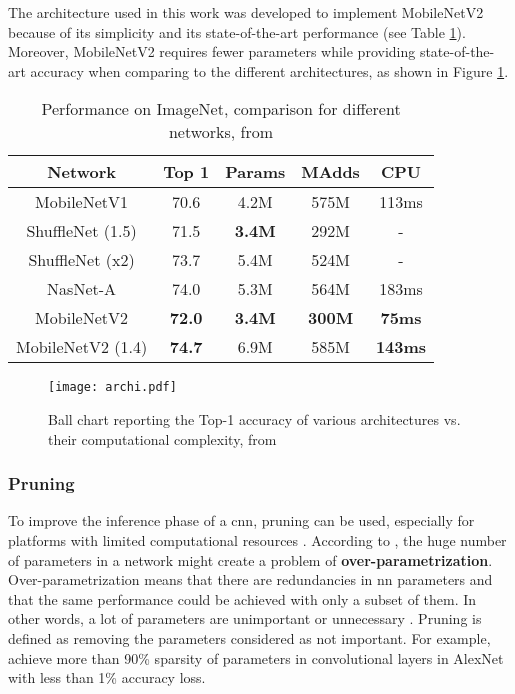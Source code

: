 The architecture used in this work was developed to implement MobileNetV2 because of its simplicity and its state-of-the-art performance (see Table \ref{tab:mbv2}). Moreover, MobileNetV2 requires fewer parameters while providing state-of-the-art accuracy when comparing to the different architectures, as shown in Figure \ref{fig:archi}.
%
\begin{table}[H]
    \center
    \begin{tabular}{ | c | c | c c | c| }
        \hline \hline
        Network & Top 1 & Params & MAdds & CPU \\
        \hline \hline
        MobileNetV1 & 70.6 & 4.2M & 575M & 113ms \\
        ShuffleNet (1.5) & 71.5 & \textbf{3.4M} & 292M & - \\
        ShuffleNet (x2)  & 73.7 & 5.4M & 524M & - \\
        NasNet-A & 74.0 & 5.3M & 564M & 183ms \\
        \hline
        MobileNetV2 & \textbf{72.0} & \textbf{3.4M} & \textbf{300M} & \textbf{75ms} \\
        MobileNetV2 (1.4) & \textbf{74.7} & 6.9M & 585M & \textbf{143ms} \\
        \hline \hline
    \end{tabular}
    \caption{Performance on ImageNet, comparison for different networks, from \cite{sandler_mobilenetv2_2018}}
    \label{tab:mbv2}
\end{table}

\begin{figure}[H]
    \centering
    \texttt{[image: archi.pdf]}
    \caption{Ball chart reporting the Top-1 accuracy of various architectures vs. their computational complexity, from \cite{canziani_analysis_2017}}
    \label{fig:archi}
\end{figure}
%
\subsubsection{Pruning} \label{subs:pruning}
%
To improve the inference phase of a \acrshort{cnn}, pruning can be used, especially for platforms with limited computational resources \cite{liu_rethinking_2019}. According to \textcite{liu_rethinking_2019, denton_exploiting_2014}, the huge number of parameters in a network might create a problem of \textbf{over-parametrization}. Over-parametrization means that there are redundancies in \acrshort{nn} parameters and that the same performance could be achieved with only a subset of them. In other words, a lot of parameters are unimportant or unnecessary \cite{cheng_recent_2018}. Pruning is defined as removing the parameters considered as not important. For example, \textcite{baoyuan_liu_sparse_2015} achieve more than 90\% sparsity of parameters in convolutional layers in AlexNet with less than 1\% accuracy loss.

